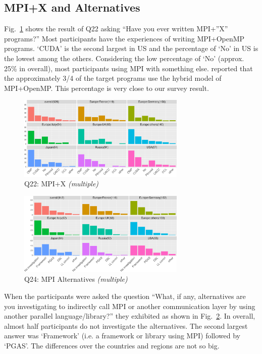 \documentclass[conference,10pt,letterpaper]{IEEEtran}
\def\myquote#1{`#1'}
\begin{document}
\subsection{MPI+X and Alternatives}

Fig.~\ref{fig:mpi-x} shows the result of Q22 asking ``Have you ever
written MPI+''X'' programs?'' Most participants have the experiences of
writing MPI+OpenMP programs. \myquote{CUDA} is the second largest in
US and the percentage of \myquote{No} in US is the lowest among the
others. Considering the low percentage of \myquote{No} (approx.
25\% in overall), most participants using MPI with something else.
\cite{10.1145/3295500.3356176} reported that the approximately 3/4 of
the target programs use the hybrid model of MPI+OpenMP. This percentage
is very close to our survey result.

\begin{figure}[htb]
\begin{center}
\includegraphics[width=8cm]{R-scripts/Q22.pdf}
\caption{Q22: MPI+X {\it(multiple)}}
\label{fig:mpi-x}
\end{center}
\end{figure}

\begin{figure}[htb]
\begin{center}
\includegraphics[width=8cm]{R-scripts/Q24.pdf}
\caption{Q24: MPI Alternatives {\it(multiple)}}
\label{fig:mpi-alternatives}
\end{center}
\end{figure}

When the participants were asked the question ``What, if any,
alternatives are you investigating to indirectly call MPI or another
communication layer by using another parallel language/library?'' they
exhibited as shown in Fig.~\ref{fig:mpi-alternatives}. In overall,
almost half participants do not investigate the alternatives. The second
largest answer was \myquote{Framework} (i.e. a framework or library
using MPI) followed by \myquote{PGAS}. The
differences over the countries and regions are not so big. 
  
\end{document}
